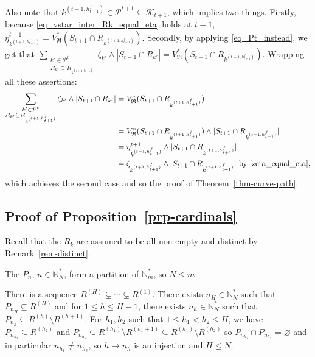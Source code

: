 \documentclass[
  11pt,
  a4paper,
]{article}
\theoremstyle{definition}
\theoremstyle{plain}
\theoremstyle{plain}
\theoremstyle{plain}
\theoremstyle{definition}
\theoremstyle{remark}
\begin{document}
Also note that
\(k^{(t+1,h^f_{t+1})}\in\mathcal{P}^{t+1}\subseteq\mathcal{K}_{t+1}\),
which implies two things. Firstly, because
\eqref{eq_vstar_inter_Rk_equal_eta} holds at \(t+1\),
\(\eta^{t+1}_{k^{(t+1,h^f_{t+1})} }=V^*_{\mathfrak{R}}( S_{t+1}\cap  R_{  k^{(t+1,h^f_{t+1})}  } )\).
Secondly, by applying \eqref{eq_Pt_instead}, we get that
\(\sum_{\substack{k'\in\mathcal{P}^{t}\\R_{k'}\subseteq  R_{  k^{(t+1,h^f_{t+1})}} }} \zeta_{k'}\wedge |S_{t+1}\cap R_{k'}| = V^*_{\mathfrak{R}}( S_{t+1}\cap  R_{  k^{(t+1,h^f_{t+1})}  } )\).
Wrapping all these assertions: \begin{align*}
\sum_{\substack{k'\in\mathcal{P}^{t}\\R_{k'}\subseteq  R_{  k^{(t+1,h^f_{t+1})}} }} \zeta_{k'}\wedge |S_{t+1}\cap R_{k'}| &= V^*_{\mathfrak{R}}( S_{t+1}\cap  R_{  k^{(t+1,h^f_{t+1})}  } )\\
&=V^*_{\mathfrak{R}}( S_{t+1}\cap  R_{  k^{(t+1,h^f_{t+1})}  } )\wedge  |S_{t+1}\cap R_{ k^{(t+1,h^f_{t+1})}}|\\
&=\eta^{t+1}_{k^{(t+1,h^f_{t+1})} }\wedge  |S_{t+1}\cap R_{ k^{(t+1,h^f_{t+1})}}|\\
&=  \zeta_{ k^{(t+1,h^f_{t+1})}}\wedge |S_{t+1}\cap R_{ k^{(t+1,h^f_{t+1})}}| \text{ by \eqref{zeta_equal_eta}},
\end{align*} which achieves the second case and so the proof of
Theorem~\ref{thm-curve-path}.

\subsection{\texorpdfstring{Proof of
Proposition~\ref{prp-cardinals}}{Proof of Proposition~}}\label{sec-cardinals}

Recall that the \(R_k\) are assumed to be all non-empty and distinct by
Remark~\ref{rem-distinct}.

The \(P_n\), \(n\in \mathbb N_N^*\), form a partition of
\(\mathbb{N}_m^*\), so \(N\leq m\).

There is a sequence \(R^{(H)}\subsetneq\dotsb\subsetneq R^{(1)}\). There
exists \(n_H\in\mathbb N_N^*\) such that \(P_{n_H}\subseteq R^{(H)}\)
and for \(1\leq h \leq H-1\), there exists \(n_h\in\mathbb N_N^*\) such
that \(P_{n_h}\subseteq R^{(h)}\setminus R^{(h+1)}\). For \(h_1, h_2\)
such that \(1\leq h_1<h_2 \leq H\), we have
\(P_{n_{h_2}}\subseteq R^{(h_2)}\) and
\(P_{n_{h_1}}\subseteq R^{(h_1)}\setminus R^{(h_1+1)}\subseteq R^{(h_1)}\setminus R^{(h_2)}\)
so \(P_{n_{h_1}}\cap P_{n_{h_2}}=\varnothing\) and in particular
\(n_{h_1}\neq n_{h_2}\), so \(h\mapsto n_h\) is an injection and
\(H\leq N\).
\end{document}
